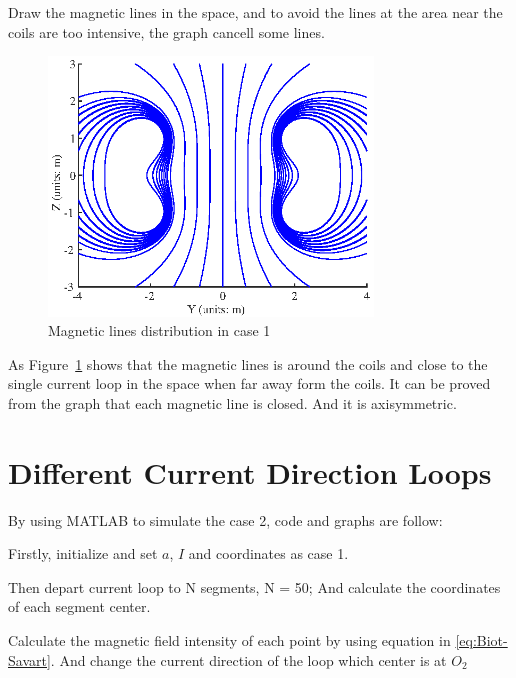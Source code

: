\documentclass[10pt, journal, final]{IEEEtran}
\begin{document}
Draw the magnetic lines in the space, and to avoid the lines at the area near the coils are too intensive, 
the graph cancell some lines.


\begin{figure}[htbp]
    \centering
    \includegraphics[width = 3.4in]{figures/work1.3.eps}
    \caption{Magnetic lines distribution in case 1}
    \label{fig:1.3}
\end{figure}
As Figure~\ref{fig:1.3} shows that the magnetic lines is around the coils and close to the single current loop in the space
when far away form the coils. It can be proved from the graph that each magnetic line is closed. And it is axisymmetric.

\section{
  Different Current Direction Loops
 }
\label{sec: Diff Direction}
By using MATLAB to simulate the case 2, code and graphs are follow:\par

Firstly, initialize and set $a$, $I$ and coordinates as case 1.


Then depart current loop to N segments, N = 50;
And calculate the coordinates of each segment center.


Calculate the magnetic field intensity of each point by using equation in \ref{eq:Biot-Savart}. And change 
the current direction of the loop which center is at $O_2$ 

\end{document}
